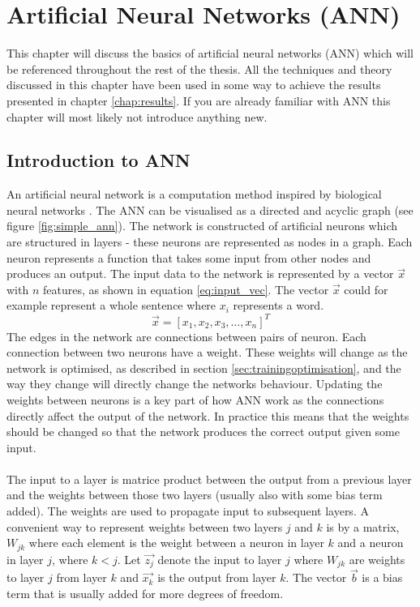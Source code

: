 \chapter{Artificial Neural Networks (ANN)}\label{chap:ann}
This chapter will discuss the basics of artificial neural networks (ANN) which will be referenced throughout the rest of the thesis. All the techniques and theory discussed in this chapter have been used in some way to achieve the results presented in chapter \ref{chap:results}. If you are already familiar with ANN this chapter will most likely not introduce anything new.

\section{Introduction to ANN}
An artificial neural network is a computation method inspired by biological neural networks \parencite{lippmann1987introduction}. The ANN can be visualised as a directed and acyclic graph (see figure \ref{fig:simple_ann}). The network is constructed of artificial neurons which are structured in layers - these neurons are represented as nodes in a graph. Each neuron represents a function that takes some input from other nodes and produces an output. The input data to the network is represented by a vector $\vec{x}$ with $n$ features, as shown in equation \ref{eq:input_vec}. The vector $\vec{x}$ could for example represent a whole sentence where $x_i$ represents a word.
\begin{equation}\label{eq:input_vec}
    \vec{x} = [x_1, x_2, x_3, \dots , x_n]^T
\end{equation}
The edges in the network are connections between pairs of neuron. Each connection between two neurons have a weight. These weights will change as the network is optimised, as described in section \ref{sec:trainingoptimisation}, and the way they change will directly change the networks behaviour. Updating the weights between neurons is a key part of how ANN work as the connections directly affect the output of the network. In practice this means that the weights should be changed so that the network produces the correct output given some input. 
\\\\
The input to a layer is matrice product between the output from a previous layer and the weights between those two layers (usually also with some bias term added). The weights are used to propagate input to subsequent layers. A convenient way to represent weights between two layers $j$ and $k$ is by a matrix, $W_{jk}$ where each element is the weight between a neuron in layer $k$ and a neuron in layer $j$, where $k<j$. Let $\vec{z_j}$ denote the input to layer $j$ where $W_{jk}$ are weights to layer $j$ from layer $k$ and $\vec{x_k}$ is the output from layer $k$. The vector $\vec{b}$ is a bias term that is usually added for more degrees of freedom. 
